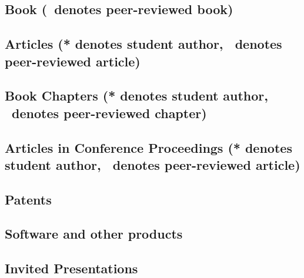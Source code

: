 \documentclass[10pt]{article}
\begin{document}
    \subsection[Book]{Book (\textdagger\ denotes peer-reviewed book)}
        \begin{refsection}
            \nocite{*}
            \printbibliography[heading=none,type=book]
        \end{refsection}
    \subsection[Articles]{Articles (* denotes student author, \textdagger\ denotes peer-reviewed article)}
    \begin{refsection}
        \nocite{*}
        \printbibliography[heading=none,type=article]
    \end{refsection}

    \subsection[Book Chapters]{Book Chapters (* denotes student author, \textdagger\ denotes peer-reviewed chapter)}
    \begin{refsection}
        \nocite{*}
        \printbibliography[heading=none,type=incollection]
    \end{refsection}
    \subsection[Articles in Conference Proceedings]{Articles in Conference Proceedings (* denotes student author, \textdagger\ denotes peer-reviewed article)}
    \begin{refsection}
        \nocite{*}
        \printbibliography[heading=none,type=inproceedings]
    \end{refsection}
  \subsection{Patents}
    \begin{refsection}
        \nocite{*}
        \printbibliography[heading=none,type=patent]
       \end{refsection}
  \subsection{Software and other products}
      
    \subsection{Invited Presentations}
    \begin{enumerate}
    
    
    \end{enumerate}
\end{document}
